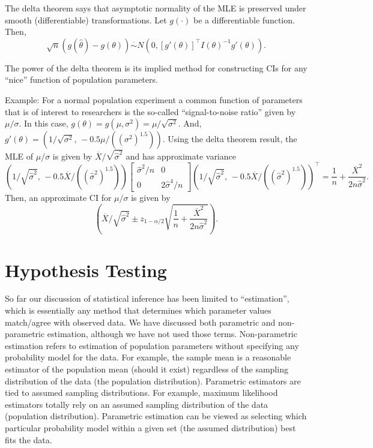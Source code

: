 \documentclass[
]{book}
\begin{document}
The delta theorem says that asymptotic normality of the MLE is preserved under smooth (differentiable) transformations. Let \(g(\cdot)\) be a differentiable function. Then,
\[\sqrt{n}(g(\hat\theta) - g(\theta))\stackrel{\cdot}{\sim} N\left(0, [g'(\theta)]^\top I(\theta)^{-1}g'(\theta)\right).\]

The power of the delta theorem is its implied method for constructing CIs for any ``nice'' function of population parameters.

Example: For a normal population experiment a common function of parameters that is of interest to researchers is the so-called ``signal-to-noise ratio'' given by \(\mu/\sigma\). In this case, \(g(\theta) = g(\mu, \sigma^2) = \mu/\sqrt{\sigma^2}\). And, \(g'(\theta) = (1/\sqrt{\sigma^2},\, -0.5\mu/({(\sigma^2)}^{1.5}))\). Using the delta theorem result, the MLE of \(\mu/\sigma\) is given by \(\overline X / \sqrt{\hat\sigma^2}\) and has approximate variance
\[(1/\sqrt{\hat\sigma^2},\, -0.5\overline X/({(\hat\sigma^2)}^{1.5})) \begin{bmatrix} \hat\sigma^2/n & 0 \\ 0 & 2\hat\sigma^4/n \end{bmatrix} (1/\sqrt{\hat\sigma^2},\, -0.5\overline X/({(\hat\sigma^2)}^{1.5}))^\top = \frac{1}{n}+\frac{\overline X^2}{2n\hat\sigma^2}.\]
Then, an approximate CI for \(\mu/\sigma\) is given by
\[\left(\overline X / \sqrt{\hat\sigma^2} \pm z_{1-\alpha/2}\sqrt{\frac{1}{n}+\frac{\overline X^2}{2n\hat\sigma^2}}\right).\]

\hypertarget{hypothesis-testing}{%
\chapter{Hypothesis Testing}\label{hypothesis-testing}}

So far our discussion of statistical inference has been limited to ``estimation'', which is essentially any method that determines which parameter values match/agree with observed data. We have discussed both parametric and non-parametric estimation, although we have not used those terms. Non-parametric estimation refers to estimation of population parameters without specifying any probability model for the data. For example, the sample mean is a reasonable estimator of the population mean (should it exist) regardless of the sampling distribution of the data (the population distribution). Parametric estimators are tied to assumed sampling distributions. For example, maximum likelihood estimators totally rely on an assumed sampling distribution of the data (population distribution). Parametric estimation can be viewed as selecting which particular probability model within a given set (the assumed distribution) best fits the data.
\end{document}
